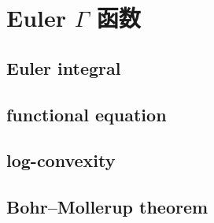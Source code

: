 \section{Euler \texorpdfstring{\(\Gamma\)}{Γ} 函数}
\label{b3:sec:2101}


\subsection{Euler integral}
\label{b3:subsec:210101}

\subsection{functional equation}
\label{b3:subsec:210102}

\subsection{log-convexity}
\label{b3:subsec:210103}

\subsection{Bohr–Mollerup theorem}
\label{b3:subsec:210104}


